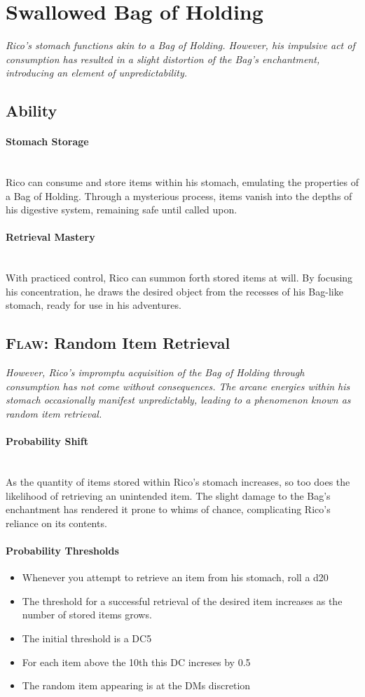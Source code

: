 {\section*{Swallowed Bag of Holding}
\textit{Rico's stomach functions akin to a Bag of Holding. However, his impulsive act of consumption has resulted in a slight distortion of the Bag's enchantment, introducing an element of unpredictability.}
\subsection*{Ability}
\paragraph*{Stomach Storage}\hfill\\
Rico can consume and store items within his stomach, emulating the properties of a Bag of Holding. Through a mysterious process, items vanish into the depths of his digestive system, remaining safe until called upon.
\paragraph*{Retrieval Mastery}\hfill\\
With practiced control, Rico can summon forth stored items at will. By focusing his concentration, he draws the desired object from the recesses of his Bag-like stomach, ready for use in his adventures.
\subsection*{\textsc{Flaw}: Random Item Retrieval}
\textit{However, Rico's impromptu acquisition of the Bag of Holding through consumption has not come without consequences. The arcane energies within his stomach occasionally manifest unpredictably, leading to a phenomenon known as random item retrieval.}
\paragraph*{Probability Shift}\hfill\\

As the quantity of items stored within Rico's stomach increases, so too does the likelihood of retrieving an unintended item. The slight damage to the Bag's enchantment has rendered it prone to whims of chance, complicating Rico's reliance on its contents.
\paragraph*{Probability Thresholds}
\begin{itemize}
	\item Whenever you attempt to retrieve an item from his stomach, roll a d20
	\item The threshold for a successful retrieval of the desired item increases as the number of stored items grows.
	\item The initial threshold is a DC5
	\item For each item above the 10th this DC increses by 0.5
	\item The random item appearing is at the DMs discretion
\end{itemize}

}
